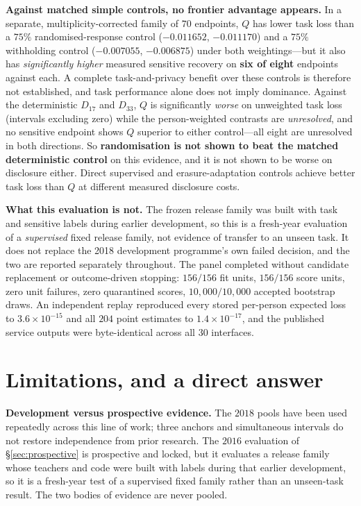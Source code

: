 \documentclass[conference]{IEEEtran}
\begin{document}
\textbf{Against matched simple controls, no frontier advantage appears.} In a separate,
multiplicity-corrected family of $70$ endpoints, $Q$ has lower task loss than a $75\%$ randomised-response
control ($-0.011652$, $-0.011170$) and a $75\%$ withholding control ($-0.007055$, $-0.006875$) under both
weightings---but it also has \emph{significantly higher} measured sensitive recovery on \textbf{six of
eight} endpoints against each. A complete task-and-privacy benefit over these controls is therefore not
established, and task performance alone does not imply dominance. Against the deterministic $D_{17}$ and
$D_{33}$, $Q$ is significantly \emph{worse} on unweighted task loss (intervals excluding zero) while the
person-weighted contrasts are \emph{unresolved}, and no sensitive endpoint shows $Q$ superior to either
control---all eight are unresolved in both directions. So \textbf{randomisation is not shown to beat the
matched deterministic control} on this evidence, and it is not shown to be worse on disclosure either. Direct
supervised and erasure-adaptation controls achieve better task loss than $Q$ at different measured
disclosure costs.

\textbf{What this evaluation is not.} The frozen release family was built with task and sensitive labels
during earlier development, so this is a fresh-year evaluation of a \emph{supervised} fixed release
family, not evidence of transfer to an unseen task. It does not replace the 2018 development programme's
own failed decision, and the two are reported separately throughout. The panel completed without candidate
replacement or outcome-driven stopping: $156/156$ fit units, $156/156$ score units, zero unit failures,
zero quarantined scores, $10{,}000/10{,}000$ accepted bootstrap draws. An independent replay reproduced
every stored per-person expected loss to $3.6\times10^{-15}$ and all $204$ point estimates to
$1.4\times10^{-17}$, and the published service outputs were byte-identical across all $30$ interfaces.

\section{Limitations, and a direct answer}
\label{sec:limits}

\textbf{Development versus prospective evidence.} The $2018$ pools have been used repeatedly across this
line of work; three anchors and simultaneous intervals do not restore independence from prior research.
The $2016$ evaluation of \S\ref{sec:prospective} is prospective and locked, but it evaluates a release
family whose teachers and code were built with labels during that earlier development, so it is a
fresh-year test of a supervised fixed family rather than an unseen-task result. The two bodies of
evidence are never pooled.
\end{document}
